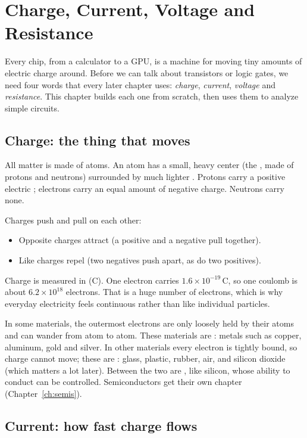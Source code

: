 \chapter{Charge, Current, Voltage and Resistance}
\label{ch:electricity}

Every chip, from a calculator to a GPU, is a machine for moving tiny amounts of electric charge around. Before we can talk about transistors or logic gates, we need four words that every later chapter uses: \emph{charge}, \emph{current}, \emph{voltage} and \emph{resistance}. This chapter builds each one from scratch, then uses them to analyze simple circuits.

\section{Charge: the thing that moves}

All matter is made of atoms. An atom has a small, heavy center (the , made of protons and neutrons) surrounded by much lighter . Protons carry a positive electric ; electrons carry an equal amount of negative charge. Neutrons carry none.

Charges push and pull on each other:
\begin{itemize}
  \item Opposite charges attract (a positive and a negative pull together).
  \item Like charges repel (two negatives push apart, as do two positives).
\end{itemize}

Charge is measured in  (C). One electron carries $1.6 \times 10^{-19}$\,C, so one coulomb is about $6.2 \times 10^{18}$ electrons. That is a huge number of electrons, which is why everyday electricity feels continuous rather than like individual particles.

In some materials, the outermost electrons are only loosely held by their atoms and can wander from atom to atom. These materials are : metals such as copper, aluminum, gold and silver. In other materials every electron is tightly bound, so charge cannot move; these are : glass, plastic, rubber, air, and silicon dioxide (which matters a lot later). Between the two are , like silicon, whose ability to conduct can be controlled. Semiconductors get their own chapter (Chapter~\ref{ch:semis}).

\section{Current: how fast charge flows}

